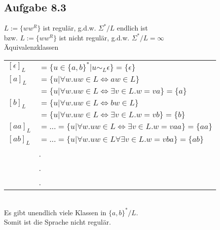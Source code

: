 \documentclass[11pt,a4paper]{article}
\begin{document}
\subsection*{Aufgabe 8.3}
$L:=\{ww^R\}$  ist regulär, g.d.w. $\Sigma^* / L$ endlich ist\\
bzw. $L:=\{ww^R\}$ ist nicht regulär, g.d.w. $\Sigma^* / L = \infty$\\

Äquivalenzklassen\\
\begin{tabular}{ll}
$[\epsilon]_L $&$= \{u \in \{a,b\}^* | u \sim_L \epsilon\} = \{\epsilon\}$\\
$[a]_L $&$= \{u | \forall w. uw \in L \Leftrightarrow aw \in L\}$\\
	&$= \{u | \forall w. uw \in L \Leftrightarrow \exists v \in L.w = va\} = \{a\}$\\
$[b]_L $&$= \{u | \forall w. uw \in L \Leftrightarrow bw \in L\}$\\
	&$= \{u | \forall w.uw \in L \Leftrightarrow \exists v \in L.w = vb\} = \{b\}$\\
$[aa]_L $&$= ... = \{u | \forall w.uw \in L \Leftrightarrow \exists v \in L.w = vaa\} = \{aa\}$\\
$[ab]_L $&$= ... = \{u | \forall w.uw \in L \forall \exists v \in L.w = vba\} = \{ab\}$\\
&.\\
&.\\
&.\\
\end{tabular}
\ \\
Es gibt unendlich viele Klassen in $\{a,b\}^*/L$.\\
Somit ist die Sprache nicht regulär.
\end{document}
